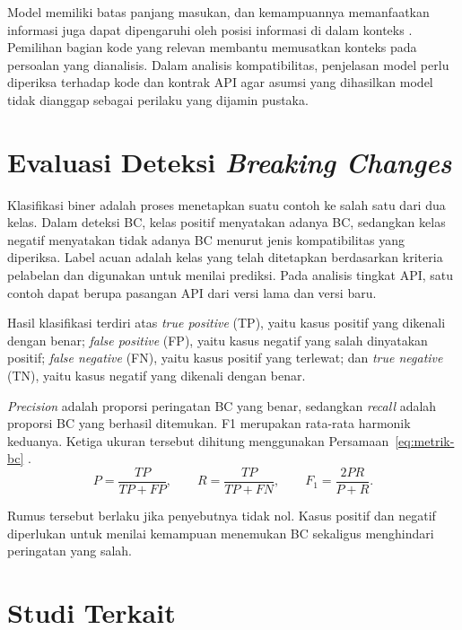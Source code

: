Model memiliki batas panjang masukan, dan kemampuannya memanfaatkan informasi juga dapat dipengaruhi oleh posisi informasi di dalam konteks \parencite{Liu2024LostMiddle}. Pemilihan bagian kode yang relevan membantu memusatkan konteks pada persoalan yang dianalisis. Dalam analisis kompatibilitas, penjelasan model perlu diperiksa terhadap kode dan kontrak API agar asumsi yang dihasilkan model tidak dianggap sebagai perilaku yang dijamin pustaka.

\section{Evaluasi Deteksi \textit{Breaking Changes}}
\label{sec:evaluasi-bc}

Klasifikasi biner adalah proses menetapkan suatu contoh ke salah satu dari dua kelas. Dalam deteksi BC, kelas positif menyatakan adanya BC, sedangkan kelas negatif menyatakan tidak adanya BC menurut jenis kompatibilitas yang diperiksa. Label acuan adalah kelas yang telah ditetapkan berdasarkan kriteria pelabelan dan digunakan untuk menilai prediksi. Pada analisis tingkat API, satu contoh dapat berupa pasangan API dari versi lama dan versi baru.

Hasil klasifikasi terdiri atas \textit{true positive} (TP), yaitu kasus positif yang dikenali dengan benar; \textit{false positive} (FP), yaitu kasus negatif yang salah dinyatakan positif; \textit{false negative} (FN), yaitu kasus positif yang terlewat; dan \textit{true negative} (TN), yaitu kasus negatif yang dikenali dengan benar.

\begin{samepage}
\textit{Precision} adalah proporsi peringatan BC yang benar, sedangkan \textit{recall} adalah proporsi BC yang berhasil ditemukan. F1 merupakan rata-rata harmonik keduanya. Ketiga ukuran tersebut dihitung menggunakan Persamaan~\ref{eq:metrik-bc} \parencite{Manning2008}.
\begin{equation}
    P = \frac{TP}{TP+FP}, \qquad
    R = \frac{TP}{TP+FN}, \qquad
    F_1 = \frac{2PR}{P+R}.
    \label{eq:metrik-bc}
\end{equation}

\end{samepage}

Rumus tersebut berlaku jika penyebutnya tidak nol. Kasus positif dan negatif diperlukan untuk menilai kemampuan menemukan BC sekaligus menghindari peringatan yang salah.

\section{Studi Terkait}
\label{sec:studi-terkait}

